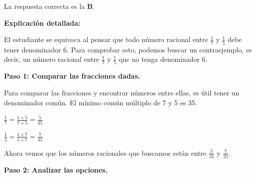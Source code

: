 \documentclass[
]{article}
\begin{document}
La respuesta correcta es la \textbf{B}.

\textbf{Explicación detallada:}

El estudiante se equivoca al pensar que todo número racional entre
\(\frac{1}{7}\) y \(\frac{1}{5}\) debe tener denominador 6. Para
comprobar esto, podemos buscar un contraejemplo, es decir, un número
racional entre \(\frac{1}{7}\) y \(\frac{1}{5}\) que no tenga
denominador 6.

\textbf{Paso 1: Comparar las fracciones dadas.}

Para comparar las fracciones y encontrar números entre ellas, es útil
tener un denominador común. El mínimo común múltiplo de 7 y 5 es 35.

\(\frac{1}{7} = \frac{1 \times 5}{7 \times 5} = \frac{5}{35}\)

\(\frac{1}{5} = \frac{1 \times 7}{5 \times 7} = \frac{7}{35}\)

Ahora vemos que los números racionales que buscamos están entre
\(\frac{5}{35}\) y \(\frac{7}{35}\).

\textbf{Paso 2: Analizar las opciones.}
\end{document}
